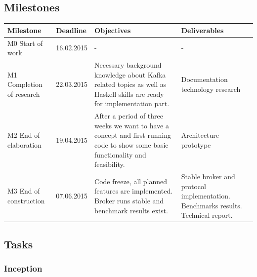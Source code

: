 \subsection{Milestones}
\begin{tabular}[H]{|p{4cm}|l|p{4.5cm}|p{4.5cm}|}\hline
    \textbf{Milestone} & \textbf{Deadline} & \textbf{Objectives} & \textbf{Deliverables} \\ \hline
    M0 Start of work & 16.02.2015 & - & -\\ \hline
    M1 Completion of research  & 22.03.2015 & 
        Necessary background knowledge about Kafka related topics as well as
        Haskell skills are ready for implementation part. 
        &
        Documentation technology research \\ \hline
    M2 End of elaboration & 19.04.2015 & 
        After a period of three weeks we want to have a concept and first running
        code to show some basic functionality and feasibility. 
        &
        Architecture prototype \\ \hline
    M3 End of construction & 07.06.2015 & 
        Code freeze, all planned features are implemented. Broker runs stable and
        benchmark results exist. 
        &
        Stable broker and protocol implementation. Benchmarks results. Technical
        report.\\ \hline
\end{tabular}
\label{tab:MeilensteineZiele}

\newpage
\subsection{Tasks}
\label{subsec:tasks}
\subsubsection{Inception}


